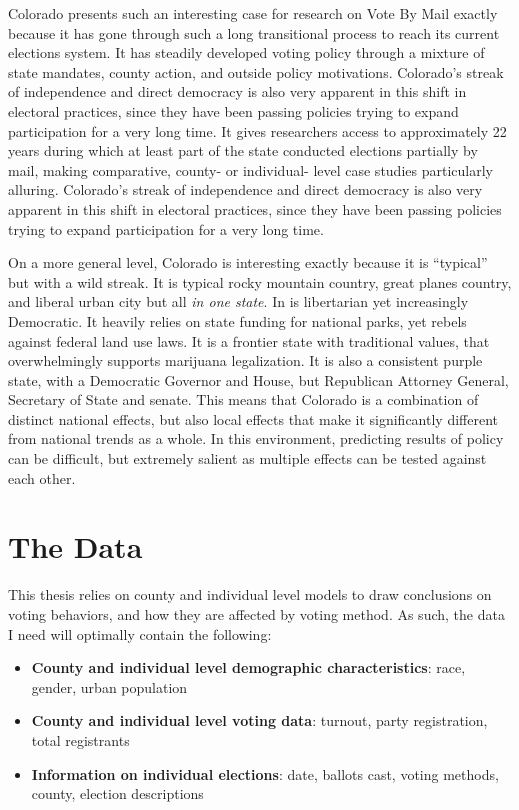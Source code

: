 \documentclass[12pt,twoside]{reedthesis}
\begin{document}
  Colorado presents such an interesting case for research on Vote By Mail
  exactly because it has gone through such a long transitional process to
  reach its current elections system. It has steadily developed voting
  policy through a mixture of state mandates, county action, and outside
  policy motivations. Colorado's streak of independence and direct
  democracy is also very apparent in this shift in electoral practices,
  since they have been passing policies trying to expand participation for
  a very long time. It gives researchers access to approximately 22 years
  during which at least part of the state conducted elections partially by
  mail, making comparative, county- or individual- level case studies
  particularly alluring. Colorado's streak of independence and direct
  democracy is also very apparent in this shift in electoral practices,
  since they have been passing policies trying to expand participation for
  a very long time.
  
  On a more general level, Colorado is interesting exactly because it is
  ``typical'' but with a wild streak. It is typical rocky mountain
  country, great planes country, and liberal urban city but all \emph{in
  one state}. In is libertarian yet increasingly Democratic. It heavily
  relies on state funding for national parks, yet rebels against federal
  land use laws. It is a frontier state with traditional values, that
  overwhelmingly supports marijuana legalization. It is also a consistent
  purple state, with a Democratic Governor and House, but Republican
  Attorney General, Secretary of State and senate. This means that
  Colorado is a combination of distinct national effects, but also local
  effects that make it significantly different from national trends as a
  whole. In this environment, predicting results of policy can be
  difficult, but extremely salient as multiple effects can be tested
  against each other.
  
  \section{The Data}\label{the-data}
  
  This thesis relies on county and individual level models to draw
  conclusions on voting behaviors, and how they are affected by voting
  method. As such, the data I need will optimally contain the following:
  
  \begin{itemize}
  \item
    \textbf{County and individual level demographic characteristics}:
    race, gender, urban population
  \item
    \textbf{County and individual level voting data}: turnout, party
    registration, total registrants
  \item
    \textbf{Information on individual elections}: date, ballots cast,
    voting methods, county, election descriptions
  \end{itemize}
  
\end{document}
